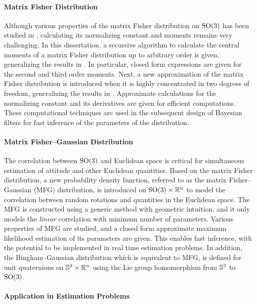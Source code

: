 \paragraph{Matrix Fisher Distribution}

Although various properties of the matrix Fisher distribution on $\mathrm{SO}(3)$ has been studied in \cite{downs1972orientation,khatri1977mises,lee2018bayesian}, calculating its normalizing constant and moments remains very challenging.
In this dissertation, a recursive algorithm to calculate the central moments of a matrix Fisher distribution up to arbitrary order is given, generalizing the results in \cite{khatri1977mises,lee2018bayesian}.
In particular, closed form expressions are given for the second and third order moments.
Next, a new approximation of the matrix Fisher distribution is introduced when it is highly concentrated in two degrees of freedom, generalizing the results in \cite{lee2018bayesian-b}.
Approximate calculations for the normalizing constant and its derivatives are given for efficient computations.
These computational techniques are used in the subsequent design of Bayesian filters for fast inference of the parameters of the distribution.

\paragraph{Matrix Fisher--Gaussian Distribution}

The correlation between $\mathrm{SO}(3)$ and Euclidean space is critical for simultaneous estimation of attitude and other Euclidean quantities.
Based on the matrix Fisher distribution, a new probability density function, referred to as the matrix Fisher--Gaussian (MFG) distribution, is introduced on $\mathrm{SO}(3)\times \mathbb{R}^n$ to model the correlation between random rotations and quantities in the Euclidean space.
The MFG is constructed using a generic method with geometric intuition, and it only models the \textit{linear} correlation with minimum number of parameters.
Various properties of MFG are studied, and a closed form approximate maximum likelihood estimation of its parameters are given.
This enables fast inference, with the potential to be implemented in real time estimation problems.
In addition, the Bingham--Gaussian distribution which is equivalent to MFG, is defined for unit quaternions on $\mathbb{S}^3\times \mathbb{R}^n$ using the Lie group homomorphism from $\mathbb{S}^3$ to $\mathrm{SO}(3)$.

\paragraph{Application in Estimation Problems}

